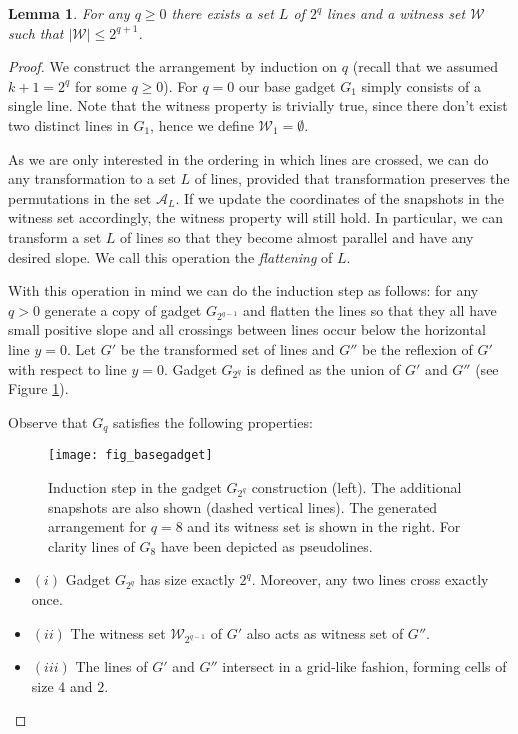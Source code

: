 \documentclass[11pt,a4paper]{article}
\newtheorem{lemma}[theorem]{Lemma}
\begin{document}
\begin{lemma}\label{LB:basicgad}
For any $q\geq 0$ there exists a set $L$ of $2^q$ lines and a witness set $\mathcal{W}$ such that $|\mathcal{W}|\leq  2^{q+1}$.
\end{lemma}
\begin{proof}
We construct the arrangement by induction on $q$ (recall that we assumed $k+1=2^q$ for some $q\geq 0$). For $q=0$ our base gadget $G_1$ simply consists of a single line. Note that the witness property is trivially true, since there don't exist two distinct lines in $G_1$, hence we define $\mathcal{W}_1=\emptyset$.

As we are only interested in the ordering in which lines are crossed, we can do any transformation to a set $L$ of lines, provided that  transformation preserves the permutations in the set $\mathcal{A}_L$. If we update the coordinates of the snapshots in the witness set accordingly, the witness property will still hold. In particular, we can transform a set $L$ of lines so that they become almost parallel and have any desired slope. We call this operation the {\em flattening} of $L$.

With this operation in mind we can do the induction step as follows: for any $q>0$ generate a copy of gadget $G_{2^{q-1}}$ and flatten the lines so that they all have small positive slope and all crossings between lines occur below the horizontal line $y=0$. Let $G'$ be the transformed set of lines and $G''$ be the reflexion of $G'$ with respect to line $y=0$. Gadget $G_{2^q}$ is defined as the union of $G'$ and $G''$ (see Figure \ref{fig_basegadget}).

Observe that $G_{q}$ satisfies the following properties:
\begin{figure}
   \begin{center}
     \texttt{[image: fig\_basegadget]}
     \caption{Induction step in the gadget $G_{2^q}$ construction (left). The additional snapshots are also shown  (dashed vertical lines). The generated arrangement for $q=8$ and its witness set is shown in the right. For clarity lines of $G_8$ have been depicted as pseudolines.}
     \label{fig_basegadget}
   \end{center}
\end{figure}

\begin{itemize}
\item[] $(i)$ Gadget $G_{2^q}$ has size exactly $2^q$. Moreover, any two lines cross exactly once.
\item[] $(ii)$ The witness set $\mathcal{W}_{2^{q-1}}$ of $G'$ also acts as witness set of $G''$.
\item[] $(iii)$ The lines of $G'$ and $G''$ intersect in a grid-like fashion, forming cells of size $4$ and $2$. \end{itemize}


\end{proof}
\end{document}
